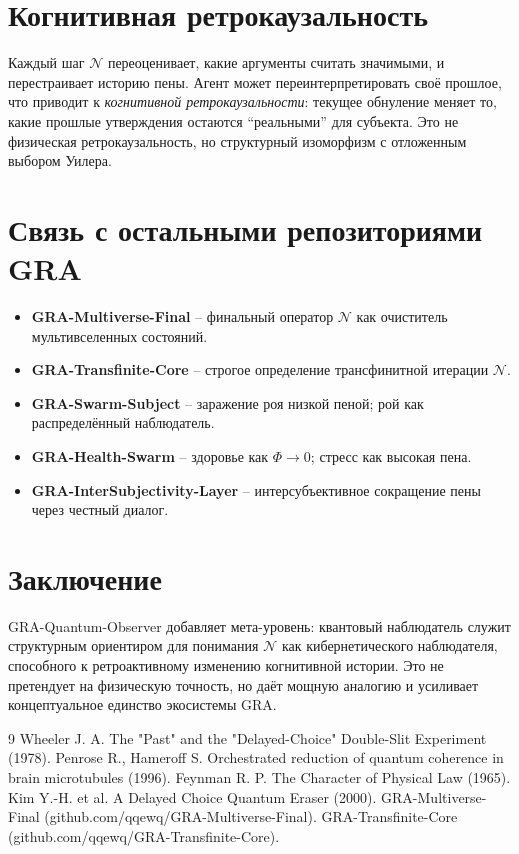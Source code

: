 \documentclass[a4paper,12pt]{article}
\begin{document}
\section{Когнитивная ретрокаузальность}
Каждый шаг $\mathcal{N}$ переоценивает, какие аргументы считать значимыми, и перестраивает историю пены. Агент может переинтерпретировать своё прошлое, что приводит к \emph{когнитивной ретрокаузальности}: текущее обнуление меняет то, какие прошлые утверждения остаются ``реальными'' для субъекта. Это не физическая ретрокаузальность, но структурный изоморфизм с отложенным выбором Уилера.

\section{Связь с остальными репозиториями GRA}
\begin{itemize}
  \item \textbf{GRA-Multiverse-Final} – финальный оператор $\mathcal{N}$ как очиститель мультивселенных состояний.
  \item \textbf{GRA-Transfinite-Core} – строгое определение трансфинитной итерации $\mathcal{N}$.
  \item \textbf{GRA-Swarm-Subject} – заражение роя низкой пеной; рой как распределённый наблюдатель.
  \item \textbf{GRA-Health-Swarm} – здоровье как $\Phi \to 0$; стресс как высокая пена.
  \item \textbf{GRA-InterSubjectivity-Layer} – интерсубъективное сокращение пены через честный диалог.
\end{itemize}

\section{Заключение}
GRA-Quantum-Observer добавляет мета-уровень: квантовый наблюдатель служит структурным ориентиром для понимания $\mathcal{N}$ как кибернетического наблюдателя, способного к ретроактивному изменению когнитивной истории. Это не претендует на физическую точность, но даёт мощную аналогию и усиливает концептуальное единство экосистемы GRA.


\begin{thebibliography}{9}
 Wheeler J. A. The "Past" and the "Delayed-Choice" Double-Slit Experiment (1978).
 Penrose R., Hameroff S. Orchestrated reduction of quantum coherence in brain microtubules (1996).
 Feynman R. P. The Character of Physical Law (1965).
 Kim Y.-H. et al. A Delayed Choice Quantum Eraser (2000).
 GRA-Multiverse-Final (github.com/qqewq/GRA-Multiverse-Final).
 GRA-Transfinite-Core (github.com/qqewq/GRA-Transfinite-Core).
\end{thebibliography}
\end{document}
